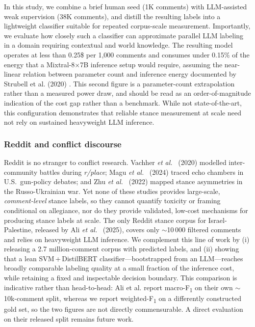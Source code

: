 \documentclass[letterpaper]{article} %
\begin{document}
In this study, we combine a brief human seed (1K comments) with LLM-assisted weak supervision (38K comments), and distill the resulting labels into a lightweight classifier suitable for repeated corpus-scale measurement. Importantly, we evaluate how closely such a classifier can approximate parallel LLM labeling in a domain requiring contextual and world knowledge. The resulting model operates at less than 0.25\$ per 1,000 comments and consumes under 0.15\% of the energy that a Mixtral-8×7B inference setup would require, assuming the near-linear relation between parameter count and inference energy documented by Strubell et al. (2020) \cite{strubell2020energy}. This second figure is a parameter-count extrapolation rather than a measured power draw, and should be read as an order-of-magnitude indication of the cost gap rather than a benchmark. While not state-of-the-art, this configuration demonstrates that reliable stance measurement at scale need not rely on sustained heavyweight LLM inference.

\subsubsection{Reddit and conflict discourse}

Reddit is no stranger to conflict research.  
Vachher \textit{et al.}~\cite{vachher2020understanding} (2020) modelled inter-community battles during \textit{r/place};  
Magu \textit{et al.}~\cite{magu2024understanding} (2024) traced echo chambers in U.S.\ gun-policy debates;  
and Zhu \textit{et al.}~\cite{zhu2022reddit} (2022) mapped stance asymmetries in the Russo-Ukrainian war.  
Yet none of these studies provides large-scale, \emph{comment-level} stance labels, so they cannot quantify toxicity or framing conditional on allegiance, nor do they provide validated, low-cost mechanisms for producing stance labels at scale.  
The only Reddit stance corpus for Israel-Palestine, released by Ali \textit{et al.}~\cite{ali2025social} (2025), covers only $\sim$10\,000 filtered comments and relies on heavyweight LLM inference.  
We complement this line of work by (i) releasing a 2.7 million-comment corpus with predicted labels, and (ii) showing that a lean SVM\,+\,DistilBERT classifier---bootstrapped from an LLM---reaches broadly comparable labeling quality at a small fraction of the inference cost, while retaining a fixed and inspectable decision boundary. This comparison is indicative rather than head-to-head: Ali et al. report macro-F\textsubscript{1} on their own $\sim$10k-comment split, whereas we report weighted-F\textsubscript{1} on a differently constructed gold set, so the two figures are not directly commensurable. A direct evaluation on their released split remains future work.
\end{document}
